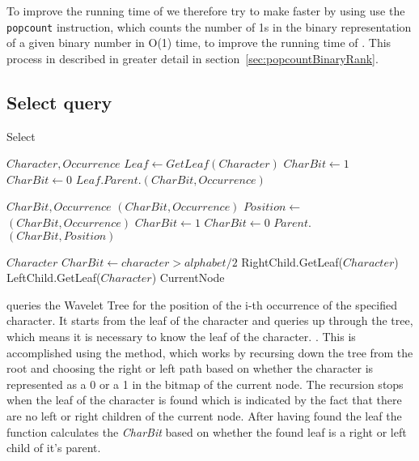 To improve the running time of  we therefore try to make  faster by using use the \texttt{popcount} instruction, which counts the number of 1s in the binary representation of a given binary number in O(1) time, to improve the running time of . 
This process in described in greater detail in section~\ref{sec:popcountBinaryRank}.

\subsection{Select query}
\begin{algorithm}
\caption{Select}
\label{alg:select}
\begin{algorithmic} 
 {$Character, Occurrence$}
\State $Leaf \gets GetLeaf(Character)$
	\State $CharBit \gets 1$
\Else
	\State $CharBit \gets 0$
\EndIf
\State \Return $Leaf.Parent.$$(CharBit, Occurrence)$
\EndFunction

\vspace{1cm}

 {$CharBit, Occurrence$}
	\State \Return {}$(CharBit, Occurrence)$
\EndIf
\State $Position \gets $$(CharBit, Occurrence)$
	\State $CharBit \gets 1$
\Else
	\State $CharBit \gets 0$
\EndIf
\State \Return $Parent.$$(CharBit, Position)$
\EndFunction

\vspace{1cm}

 {$Character$}
\State $CharBit \gets character > alphabet/2$
	\State RightChild.GetLeaf($Character$)
	\State LeftChild.GetLeaf($Character$)
\EndIf
\State \Return CurrentNode
\EndFunction
\end{algorithmic}
\end{algorithm}

 queries the Wavelet Tree for the position of the i-th occurrence of the specified character.
It starts from the leaf of the character and queries up through the tree, which means it is necessary to know the leaf of the character. \citep[Section 2.2]{Claude08practicalrankselect}. 
This is accomplished using the  method, which works by recursing down the tree from the root and choosing the right or left path based on whether the character is represented as a 0 or a 1 in the bitmap of the current node.
The recursion stops when the leaf of the character is found which is indicated by the fact that there are no left or right children of the current node.
After having found the leaf the  function calculates the \textit{CharBit} based on whether the found leaf is a right or left child of it's parent.

